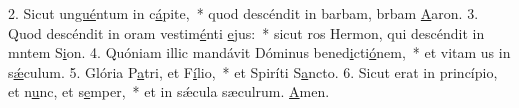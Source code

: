 2. Sicut un\uline{gué}ntum in c\uline{á}pite,~* quod descéndit in barbam, brbam \uline{A}aron.
3. Quod descéndit in oram vestim\uline{é}nti \uline{e}jus:~* sicut ros Hermon, qui descéndit in mntem S\uline{i}on.
4. Quóniam illic mandávit Dóminus bened\uline{i}cti\uline{ó}nem,~* et vitam us in s\uline{ǽ}culum.
5. Glória P\uline{a}tri, et F\uline{í}lio,~* et Spiríti S\uline{a}ncto.
6. Sicut erat in princípio, et n\uline{u}nc, et s\uline{e}mper,~* et in sǽcula sæculrum. \uline{A}men.
